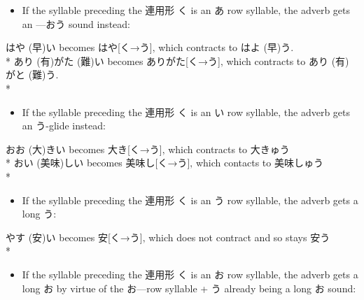 \documentclass[11pt, b5paper, twoside, openright, onecolumn]{book}
\makeatletter
\newcommand*{\rubystack}[2]{{\relscale{0.5}%
  \begin{tabular}[b]{@{}c@{}}%
    {#1}\\%
   {\textscale{2}{#2}}%
  \end{tabular}}%
}
\DeclareRobustCommand*{\ruby}[2]{%
  \mbox{%
    \setlength{\parskip}{0ex}%
    \BeginAccSupp{method=pdfstringdef,ActualText={#1}}%
      \rubystack{\phantom{#2}}{#1}%
      \llap{%
        \rubystack{#2}{\phantom{#1}}%
      }%
    \EndAccSupp{}%
  }%
}
\renewcommand*{\ruby}[2]{#2 (#1)}%
\newenvironment{exampleblock}{
\setlength{\parindent}{0.6in}
\begin{minipage}[t]{\dimexpr\textwidth-\parindent}}
{\end{minipage}}
\makeatother
\begin{document}
\begin{itemize}
\item If the syllable preceding the 連用形 く is an あ row syllable‚ the adverb gets an —おう sound instead:
\end{itemize}

\vspace{0.4cm}
\begin{exampleblock}
\ruby{早}{はや}い becomes はや[く→う]‚ which contracts to \ruby{早}{はよ}う. \\* 
\ruby{有}{あり}\ruby{難}{がた}い becomes ありがた[く→う]‚ which contracts to \ruby{有}{あり}\ruby{難}{がと}う. \\* 
\end{exampleblock}
\vspace{0.2cm}

\begin{itemize}
\item If the syllable preceding the 連用形 く is an い row syllable‚ the adverb gets an う-glide instead:
\end{itemize}

\vspace{0.4cm}
\begin{exampleblock}
\ruby{大}{おお}きい becomes 大き[く→う]‚ which contracts to 大きゅう \\* 
\ruby{美味}{おい}しい becomes 美味し[く→う]‚ which contacts to 美味しゅう \\* 
\end{exampleblock}
\vspace{0.2cm}

\begin{itemize}
\item If the syllable preceding the 連用形 く is an う row syllable‚ the adverb gets a long う:
\end{itemize}

\vspace{0.4cm}
\begin{exampleblock}
\ruby{安}{やす}い becomes 安[く→う]‚ which does not contract and so stays 安う \\* 
\end{exampleblock}
\vspace{0.2cm}

\begin{itemize}
\item If the syllable preceding the 連用形 く is an お row syllable‚ the adverb gets a long お by virtue of the お—row syllable + う already being a long お sound:
\end{itemize}
\end{document}
